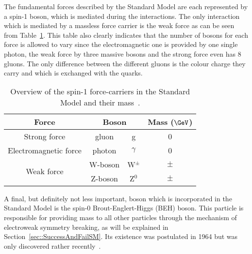 The fundamental forces described by the Standard Model are each represented by a spin-1 boson, which is mediated during the interactions.
The only interaction which is mediated by a massless force carrier is the weak force as can be seen from Table~\ref{table::ForceCarriers}.
This table also clearly indicates that the number of bosons for each force is allowed to vary since the electromagnetic one is provided by one single photon, the weak force by three massive bosons and the strong force even has 8 gluons. The only difference between the different gluons is the colour charge they carry and which is exchanged with the quarks.

\begin{table}[h!t]
 \centering
 \caption{Overview of the spin-1 force-carriers in the Standard Model and their mass~\cite{WMass,ZMass}.} \label{table::ForceCarriers}
 \begin{tabular}{|c|cc|c|}%
  \hline
  \textbf{Force} 		&\multicolumn{2}{c|}{\textbf{Boson}} 	& \textbf{Mass ($\GeV$)}	\\%
  \hline
  Strong force 			& gluon 	& g 			& 0 				\\%
  \hline
  Electromagnetic force		& photon 	& $\gamma$ 		& 0 				\\%
  \hline
  \multirow{2}{*}{Weak force} 	& W-boson 	& W$^{\pm}$ 		& $\pm$ 			\\%
				& Z-boson 	& Z$^{0}$ 		& $\pm$ 			\\%
  \hline
 \end{tabular}
\end{table}

A final, but definitely not less important, boson which is incorporated in the Standard Model is the spin-0 Brout-Englert-Higgs (BEH) boson. This particle is responsible for providing mass to all other particles through the mechanism of electroweak symmetry breaking, as will be explained in Section~\ref{sec::SuccessAndFailSM}. Its existence was postulated in 1964 but was only discovered rather recently~\cite{Higgs}.


